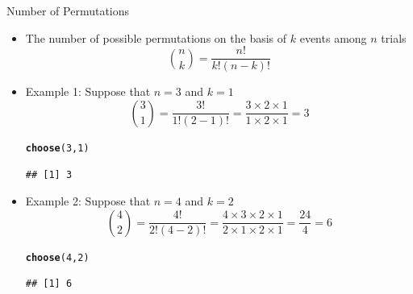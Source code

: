 \documentclass[xcolor=x11names,compress]{beamer}\usepackage[]{graphicx}\usepackage[]{color}
\makeatletter
\newcommand{\hlnum}[1]{\textcolor[rgb]{0.686,0.059,0.569}{#1}}%
\newcommand{\hlstd}[1]{\textcolor[rgb]{0.345,0.345,0.345}{#1}}%
\newcommand{\hlkwd}[1]{\textcolor[rgb]{0.737,0.353,0.396}{\textbf{#1}}}%
\newenvironment{kframe}{%
 \def\at@end@of@kframe{}%
 \ifinner\ifhmode%
  \def\at@end@of@kframe{\end{minipage}}%
  \begin{minipage}{\columnwidth}%
 \fi\fi%
 \def\FrameCommand##1{\hskip\@totalleftmargin \hskip-\fboxsep
 \colorbox{shadecolor}{##1}\hskip-\fboxsep
     \hskip-\linewidth \hskip-\@totalleftmargin \hskip\columnwidth}%
 \MakeFramed {\advance\hsize-\width
   \@totalleftmargin\z@ \linewidth\hsize
   \@setminipage}}%
 {\par\unskip\endMakeFramed%
 \at@end@of@kframe}
\newenvironment{knitrout}{}{} %
\makeatother
\begin{document}
\begin{frame}[fragile]{Number of Permutations}
  \begin{itemize}
  \item The number of possible permutations on the basis of $k$ events
        among $n$ trials
        \begin{equation*}
          {n \choose k} = \frac{n!}{k! (n-k)!}
        \end{equation*}
  \item Example 1: Suppose that $n=3$ and $k=1$
    \begin{equation*}
       {3 \choose 1} =\frac{3!}{1! (2-1)!} = \frac{3\times 2 \times 1}{1 \times 2 \times 1} = 3
    \end{equation*}
\begin{knitrout}\tiny
{}\color{fgcolor}\begin{kframe}
\begin{alltt}
\hlkwd{choose}\hlstd{(}\hlnum{3}\hlstd{,}\hlnum{1}\hlstd{)}
\end{alltt}
\begin{verbatim}
## [1] 3
\end{verbatim}
\end{kframe}
\end{knitrout}
   \item Example 2: Suppose that $n=4$ and $k=2$
       \begin{equation*}
     {4 \choose 2} =
      \frac{4!}{2! (4-2)!} = \frac{4\times 3\times 2 \times 1}{2\times 1 \times 2 \times 1} = \frac{24}{4}=6
    \end{equation*}  
\begin{knitrout}\tiny
{}\color{fgcolor}\begin{kframe}
\begin{alltt}
\hlkwd{choose}\hlstd{(}\hlnum{4}\hlstd{,}\hlnum{2}\hlstd{)}
\end{alltt}
\begin{verbatim}
## [1] 6
\end{verbatim}
\end{kframe}
\end{knitrout}
  \end{itemize}
\end{frame}
\end{document}
